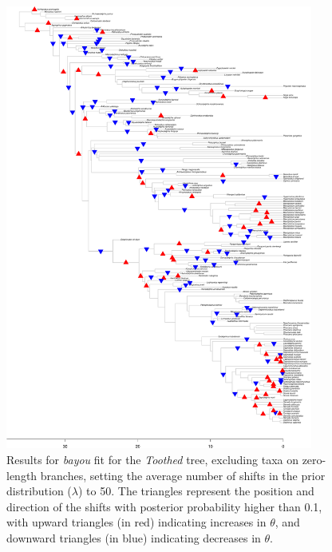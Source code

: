\begin{figure}[H]
\includegraphics[width=0.9\textwidth]{img/plots-toothed-k50-1.pdf}
\caption{Results for \textit{bayou} fit for the \textit{Toothed} tree, excluding taxa on zero-length branches, setting the average number of shifts in the prior distribution ($\lambda$) to 50. The triangles represent the position and direction of the shifts with posterior probability higher than 0.1, with upward triangles (in red) indicating increases in $\theta$, and downward triangles (in blue) indicating decreases in $\theta$.}
\label{fig:toothed-k50-nzlb}
\end{figure}

\clearpage
